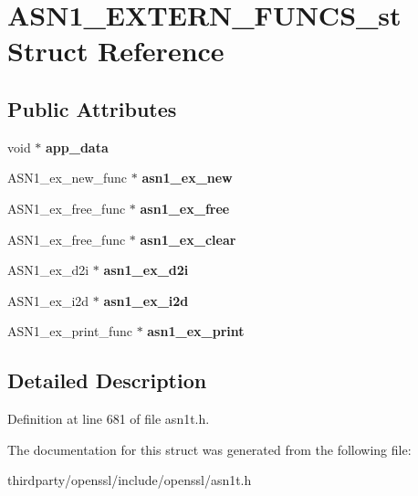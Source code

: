 \hypertarget{struct_a_s_n1___e_x_t_e_r_n___f_u_n_c_s__st}{}\section{A\+S\+N1\+\_\+\+E\+X\+T\+E\+R\+N\+\_\+\+F\+U\+N\+C\+S\+\_\+st Struct Reference}
\label{struct_a_s_n1___e_x_t_e_r_n___f_u_n_c_s__st}
\subsection*{Public Attributes}
\begin{DoxyCompactItemize}
\item 
\mbox{\label{struct_a_s_n1___e_x_t_e_r_n___f_u_n_c_s__st_aeab59571882fc1a035b3e68ea20eb8ab}} 
void $\ast$ {\bfseries app\+\_\+data}
\item 
\mbox{\label{struct_a_s_n1___e_x_t_e_r_n___f_u_n_c_s__st_aaba71f535decc929f44857651b39934c}} 
A\+S\+N1\+\_\+ex\+\_\+new\+\_\+func $\ast$ {\bfseries asn1\+\_\+ex\+\_\+new}
\item 
\mbox{\label{struct_a_s_n1___e_x_t_e_r_n___f_u_n_c_s__st_abdcdceb05e0645c60431380e0161eb51}} 
A\+S\+N1\+\_\+ex\+\_\+free\+\_\+func $\ast$ {\bfseries asn1\+\_\+ex\+\_\+free}
\item 
\mbox{\label{struct_a_s_n1___e_x_t_e_r_n___f_u_n_c_s__st_ad72f18057e4903c853d2a9cad4b8ea15}} 
A\+S\+N1\+\_\+ex\+\_\+free\+\_\+func $\ast$ {\bfseries asn1\+\_\+ex\+\_\+clear}
\item 
\mbox{\label{struct_a_s_n1___e_x_t_e_r_n___f_u_n_c_s__st_a21a25960f9687e7456623303538a03f5}} 
A\+S\+N1\+\_\+ex\+\_\+d2i $\ast$ {\bfseries asn1\+\_\+ex\+\_\+d2i}
\item 
\mbox{\label{struct_a_s_n1___e_x_t_e_r_n___f_u_n_c_s__st_a62c0513bce357e37e73318f641f6b74c}} 
A\+S\+N1\+\_\+ex\+\_\+i2d $\ast$ {\bfseries asn1\+\_\+ex\+\_\+i2d}
\item 
\mbox{\label{struct_a_s_n1___e_x_t_e_r_n___f_u_n_c_s__st_a9609c50686e5385236dd12796813ec0e}} 
A\+S\+N1\+\_\+ex\+\_\+print\+\_\+func $\ast$ {\bfseries asn1\+\_\+ex\+\_\+print}
\end{DoxyCompactItemize}


\subsection{Detailed Description}


Definition at line 681 of file asn1t.\+h.



The documentation for this struct was generated from the following file\+:\begin{DoxyCompactItemize}
\item 
thirdparty/openssl/include/openssl/asn1t.\+h\end{DoxyCompactItemize}
